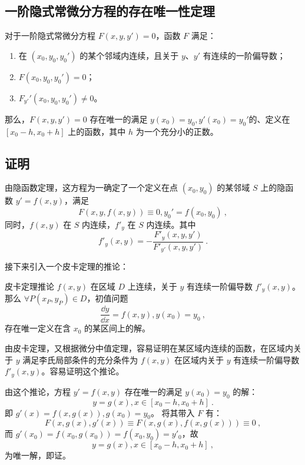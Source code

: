 

\subsection{一阶隐式常微分方程的存在唯一性定理}

对于一阶隐式常微分方程 $F(x, y, y')=0$，函数 $F$ 满足：
\begin{enumerate}
\item 在 $(x_0, y_0, y_0')$ 的某个邻域内连续，且关于 $y$、$y'$ 有连续的一阶偏导数；
\item $F(x_0, y_0, y_0')=0$；
\item $F_{y'}'(x_0, y_0, y_0')\neq 0$。
\end{enumerate}
那么，$F(x, y, y') = 0$ 存在唯一的满足 $y(x_0) = y_0, y'(x_0) = y_0' $的、定义在 $[x_0-h, x_0+h]$ 上的函数，其中 $h$ 为一个充分小的正数。

\subsection{证明}

由隐函数定理，这方程为一确定了一个定义在点 $(x_0, y_0)$ 的某邻域 $S$ 上的隐函数 $y'=f(x, y)$，满足
$$F(x, y, f(x,y)) \equiv 0, y_0'=f(x_0, y_0) ~,$$
同时，$f(x, y)$ 在 $S$ 内连续，$f'_y$ 在 $S$ 内连续。其中
$$f'_y(x, y) = - \frac{F'_y(x, y, y')}{F'_{y'}(x, y, y')} ~.$$

接下来引入一个皮卡定理的推论：
\begin{corollary}{皮卡定理推论}
$f(x, y)$ 在区域 $D$ 上连续，关于 $y$ 有连续一阶偏导数 $f'_y(x, y)$。
那么
$\forall P(x_P, y_P) \in D$，初值问题
$$\frac{\dd y}{\dd x} = f(x, y), y(x_0) = y_0 ~,$$
存在唯一定义在含 $x_0$ 的某区间上的解。

由皮卡定理，又根据微分中值定理，容易证明在某区域内连续的函数，在区域内关于 $y$ 满足李氏局部条件的充分条件为 $f(x, y)$ 在区域内关于 $y$ 有连续一阶偏导数 $f'_y(x, y)$。容易证明这个推论。
\end{corollary}

由这个推论，方程 $y'=f(x, y)$ 存在唯一的满足 $y(x_0)=y_0$ 的解：
$$y=g(x), x \in [x_0-h, x_0+h] ~.$$
即 $g'(x) = f(x, g(x)), g(x_0) = y_0$。
将其带入 $F$ 有：
$$F(x,g(x),g'(x)) \equiv F(x, g(x), f(x,g(x))) \equiv 0 ~,$$
而 $g'(x_0)=f(x_0, g(x_0))=f(x_0,y_0)=y'_0$，故
$$y=g(x), x\in[x_0-h, x_0+h] ~,$$
为唯一解，即证。